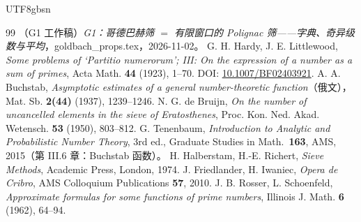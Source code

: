 \documentclass[11pt,a4paper]{article}
\theoremstyle{plain}
\theoremstyle{definition}
\begin{document}
\begin{CJK}{UTF8}{gbsn}
\begin{thebibliography}{99}
 （G1 工作稿）\emph{G1：哥德巴赫筛 $=$ 有限窗口的 Polignac 筛——字典、奇异级数与平均}，goldbach\_props.tex，2026-11-02。
 G. H. Hardy, J. E. Littlewood, \emph{Some problems of `Partitio numerorum'; III: On the expression of a number as a sum of primes},
Acta Math. \textbf{44} (1923), 1--70. DOI: \url{10.1007/BF02403921}.
 A. A. Buchstab, \emph{Asymptotic estimates of a general number-theoretic function}（俄文），Mat. Sb. \textbf{2(44)} (1937), 1239--1246.
 N. G. de Bruijn, \emph{On the number of uncancelled elements in the sieve of Eratosthenes},
Proc. Kon. Ned. Akad. Wetensch. \textbf{53} (1950), 803--812.
 G. Tenenbaum, \emph{Introduction to Analytic and Probabilistic Number Theory}, 3rd ed., Graduate Studies in Math.\ \textbf{163}, AMS, 2015（第 III.6 章：Buchstab 函数）。
 H. Halberstam, H.-E. Richert, \emph{Sieve Methods}, Academic Press, London, 1974.
 J. Friedlander, H. Iwaniec, \emph{Opera de Cribro}, AMS Colloquium Publications \textbf{57}, 2010.
 J. B. Rosser, L. Schoenfeld, \emph{Approximate formulas for some functions of prime numbers}, Illinois J. Math. \textbf{6} (1962), 64--94.
\end{thebibliography}

\end{CJK}
\end{document}
